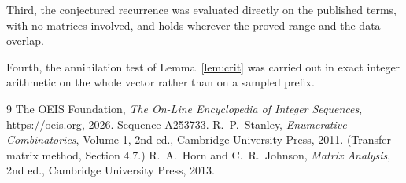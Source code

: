 \documentclass[11pt,a4paper]{article}
\theoremstyle{plain}
\theoremstyle{definition}
\begin{document}
Third, the conjectured recurrence was evaluated directly on the published terms, with no
matrices involved, and holds wherever the proved range and the data overlap.

Fourth, the annihilation test of Lemma~\ref{lem:crit} was carried out in exact integer
arithmetic on the whole vector rather than on a sampled prefix.

\begin{thebibliography}{9}
 The OEIS Foundation, \emph{The On-Line Encyclopedia of Integer
Sequences}, \url{https://oeis.org}, 2026. Sequence A253733.
 R.~P.~Stanley, \emph{Enumerative Combinatorics}, Volume 1, 2nd ed.,
Cambridge University Press, 2011. (Transfer-matrix method, Section 4.7.)
 R.~A.~Horn and C.~R.~Johnson, \emph{Matrix Analysis}, 2nd ed., Cambridge
University Press, 2013.
\end{thebibliography}
\end{document}
